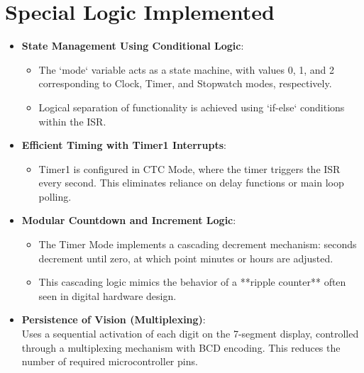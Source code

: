 \documentclass[journal]{IEEEtran}
\begin{document}
\section{Special Logic Implemented}
\begin{itemize}
    \item \textbf{State Management Using Conditional Logic}:
    \begin{itemize}
    \item The `mode` variable acts as a state machine, with values 0, 1, and 2 corresponding to Clock, Timer, and Stopwatch modes, respectively.
    \item Logical separation of functionality is achieved using `if-else` conditions within the ISR.
    \end{itemize}

    \item \textbf{Efficient Timing with Timer1 Interrupts}:
    \begin{itemize}
    \item Timer1 is configured in CTC Mode, where the timer triggers the ISR every second. This eliminates reliance on delay functions or main loop polling.
    \end{itemize}

    \item \textbf{Modular Countdown and Increment Logic}:
    \begin{itemize}
    \item  The Timer Mode implements a cascading decrement mechanism: seconds decrement until zero, at which point minutes or hours are adjusted.
     \item This cascading logic mimics the behavior of a **ripple counter** often seen in digital hardware design.
     \end{itemize}

    \item \textbf{Persistence of Vision (Multiplexing)}:\\Uses a sequential activation of each digit on the 7-segment display, controlled through a multiplexing mechanism with BCD encoding. This reduces the number of required microcontroller pins.
\end{itemize}
\end{document}

